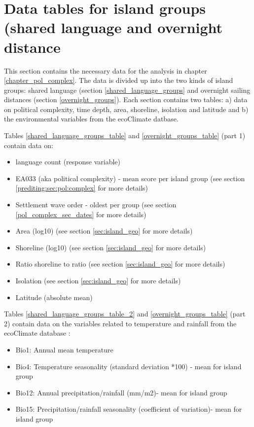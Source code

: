\documentclass[draft,10pt]{article} %
\begin{document}
\section{Data tables for island groups (shared language and overnight distance}
\singlespacing
This section contains the necessary data for the analysis in chapter \ref{chapter_pol_complex}. The data is divided up into the two kinds of island groups: shared language (section \ref{shared_language_groups} and overnight sailing distances (section \ref{overnight_groups}). Each section contains two tables: a) data on political complexity, time depth, area, shoreline, isolation and latitude and b) the environmental variables from the ecoClimate datbase.

Tables \ref{shared_language_groups_table} and \ref{overnight_groups_table} (part 1) contain data on:

\begin{itemize}
\item language count (response variable)
\item EA033 (aka political complexity) - mean score per island group (see section \ref{prediting:sec:pol:complex} for more details)
\item Settlement wave order - oldest per group (see section \ref{pol_complex_sec_dates} for more details)
\item Area (log10) (see section \ref{sec:island_geo} for more details)
\item Shoreline (log10) (see section \ref{sec:island_geo} for more details)
\item Ratio shoreline to ratio (see section \ref{sec:island_geo} for more details)
\item Isolation (see section \ref{sec:island_geo} for more details)
\item Latitude (absolute mean)
\end{itemize}

Tables \ref{shared_language_groups_table_2} and \ref{overnight_groups_table} (part 2) contain data on the variables related to temperature and rainfall from the ecoClimate database \citep{ecoclimate}:

\begin{itemize}
\item Bio1: Annual mean temperature
\item Bio4: Temperature seasonality (standard deviation *100) - mean for island group
\item Bio12: Annual precipitation/rainfall (mm/m2)- mean for island group
\item Bio15: Precipitation/rainfall seasonality (coefficient of variation)- mean for island group
\end{itemize}
\end{document}
